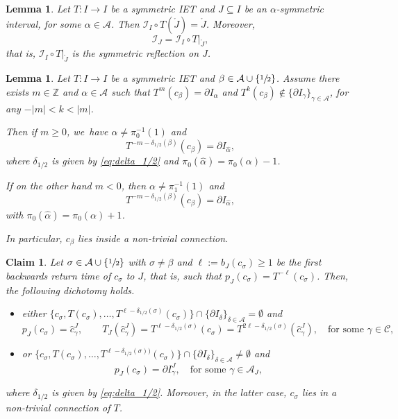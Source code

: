 \documentclass[10pt,a4paper]{article}
\theoremstyle{plain}
\newtheorem{lemma}[theorem]{Lemma}
\newtheorem{claim}{Claim}
\theoremstyle{definition}
\newcommand{\A}{\mathcal{A}}
\newcommand{\I}{\mathcal{I}}
\newcommand{\Z}{\mathbb{Z}}
\begin{document}
\begin{lemma}\label{lem: local_reflection}
Let $T : I \to I$ be a symmetric IET and $J \subseteq I$ be an $\alpha$-symmetric interval, for some $\alpha \in \A$. Then $\mathcal{I}_I\circ T(\mathring{J}) = \mathring{J}$. Moreover,
\[
\I_J = \mathcal{I}_I\circ T|_{\mathring{J}},
\]
that is, $\mathcal{I}_I\circ T|_{\mathring{J}}$ is the symmetric reflection on $J$.
\end{lemma}

\begin{lemma}
\label{lem:symmetric_connection}
Let $T: I \to I$ be a symmetric IET and $\beta \in \A \cup \{\sfrac{1}{2}\}$. Assume there exists $m \in \Z$ and $\alpha \in \A$ such that $T^m(c_\beta) = \partial I_\alpha$ and $T^k(c_\beta) \notin \{\partial I_\gamma\}_{\gamma \in \A}$, for any $-|m| < k < |m|$.

Then {if $m\ge 0$}, we~have $\alpha \neq \pi_0^{-1}(1)$ and\vspace*{-3pt}
\[
T^{-m - \delta_{1/2}(\beta)}(c_\beta) = \partial I_{\hat \alpha},
\]
where $\delta_{1/2}$ is given by \eqref{eq:delta_1/2} and $\pi_0( \hat \alpha) = \pi_0(\alpha) - 1$.

{If on the other hand $m<0$, then $\alpha\neq \pi_1^{-1}(1)$ and\vspace*{-3pt}
\[
T^{-m - \delta_{1/2}(\beta)}(c_\beta) = \partial I_{\hat \alpha},
\]
with $\pi_0( \hat \alpha) = \pi_0(\alpha) + 1$.
}

In particular, $c_\beta$ lies inside a non-trivial connection.
\end{lemma}

\begin{claim}
\label{cl:backward_centers}
Let $\sigma \in \A \cup \{\sfrac{1}{2}\}$ with $\sigma \neq \beta$ and $\ell := b_J(c_\sigma) \geq 1$ be the first backwards return time of $c_\sigma$ to $J$, that is, such that $p_J(c_\sigma) = T^{-\ell}(c_\sigma)$. Then, the following dichotomy holds.
\begin{itemize}
\item either $\{c_\sigma, T(c_\sigma), \ldots, T^{\ell - \delta_{1/2}(\sigma)}(c_\sigma)\} \cap \{\partial I_\delta\}_{\delta \in \A} = \emptyset$ and
\[
p_J(c_\sigma) = \hat c_\gamma^J,\qquad T_J(\hat c_\gamma^J) = T^{\ell - \delta_{1/2}(\sigma)}(c_\sigma) = T^{2\ell - \delta_{1/2}(\sigma)}(\hat c_\gamma^J), \quad \text{for some } \gamma \in \mathcal C,
\]
\item or $\{c_\sigma, T(c_\sigma), \ldots, T^{\ell - \delta_{1/2}(\sigma))}(c_\sigma)\} \cap \{\partial I_\delta\}_{\delta \in \A} \neq \emptyset$ and
\[
p_J(c_\sigma) = \partial I_\gamma^J,\quad\text{for some } \gamma \in \A_J,
\]
\end{itemize}
where $\delta_{1/2}$ is given by \eqref{eq:delta_1/2}. Moreover, in the latter case, $c_\sigma$ lies in a non-trivial connection of $T$.
\end{claim}
\end{document}
